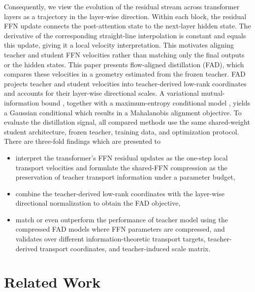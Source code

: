 \documentclass{article}
\theoremstyle{plain}
\theoremstyle{definition}
\theoremstyle{remark}
\begin{document}
Consequently, we view the evolution of the residual stream across transformer layers as a trajectory in the layer-wise direction. Within each block, the residual FFN update connects the post-attention state to the next-layer hidden state. The derivative of the corresponding straight-line interpolation is constant and equals this update, giving it a local velocity interpretation. This motivates aligning teacher and student FFN velocities rather than matching only the final outputs or the hidden states. This paper presents flow-aligned distillation (FAD), which compares these velocities in a geometry estimated from the frozen teacher. FAD projects teacher and student velocities into teacher-derived low-rank coordinates and accounts for their layer-wise directional scales. A variational mutual-information bound \citep{barber2003im,poole2019variational}, together with a maximum-entropy conditional model
\citep{jaynes1957information}, yields a Gaussian conditional which results in a Mahalanobis alignment objective. To evaluate the distillation signal, all compared methods use the same shared-weight student architecture, frozen teacher, training data, and
optimization protocol. There are three-fold findings which are presented to
\begin{itemize}
\item[$-$] interpret the transformer's FFN residual updates as the one-step local transport velocities and formulate the shared-FFN compression as the preservation of teacher transport information under a parameter budget,
\item[$-$] combine the teacher-derived low-rank coordinates with the layer-wise directional normalization to obtain the FAD objective,
\item[$-$] match or even outperform the performance of teacher model using the compressed FAD models where FFN parameters are compressed, and validates over different information-theoretic transport targets, teacher-derived transport coordinates, and teacher-induced scale matrix.
\end{itemize}

\section{Related Work}
\label{sec:related}
\end{document}
